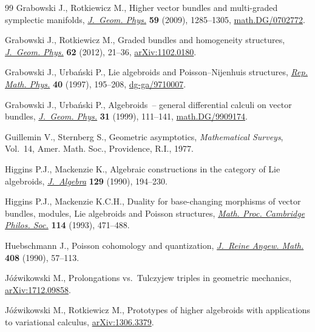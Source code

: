 \documentclass[10pt,a4paper]{amsart}
\numberwithin{equation}{section}
\theoremstyle{definition}
\begin{document}
\begin{thebibliography}{99}
Grabowski J., Rotkiewicz M., Higher vector bundles and multi-graded symplectic
 manifolds, \href{https://doi.org/10.1016/j.geomphys.2009.06.009}{\textit{J.~Geom. Phys.}} \textbf{59} (2009), 1285--1305,
 \href{https://arxiv.org/abs/math.DG/0702772}{math.DG/0702772}.

Grabowski J., Rotkiewicz M., Graded bundles and homogeneity structures,
 \href{https://doi.org/10.1016/j.geomphys.2011.09.004}{\textit{J.~Geom. Phys.}} \textbf{62} (2012), 21--36, \href{https://arxiv.org/abs/1102.0180}{arXiv:1102.0180}.

Grabowski J., Urba\'{n}ski P., Lie algebroids and {P}oisson--{N}ijenhuis
 structures, \href{https://doi.org/10.1016/S0034-4877(97)85916-2}{\textit{Rep. Math. Phys.}} \textbf{40} (1997), 195--208,
 \href{https://arxiv.org/abs/dg-ga/9710007}{dg-ga/9710007}.

Grabowski J., Urba\'{n}ski P., Algebroids~-- general differential calculi on
 vector bundles, \href{https://doi.org/10.1016/S0393-0440(99)00007-8}{\textit{J.~Geom. Phys.}} \textbf{31} (1999), 111--141,
 \href{https://arxiv.org/abs/math.DG/9909174}{math.DG/9909174}.

Guillemin V., Sternberg S., Geometric asymptotics, \textit{Mathematical
 Surveys}, Vol.~14, Amer. Math. Soc., Providence, R.I., 1977.

Higgins P.J., Mackenzie K., Algebraic constructions in the category of {L}ie
 algebroids, \href{https://doi.org/10.1016/0021-8693(90)90246-K}{\textit{J.~Algebra}} \textbf{129} (1990), 194--230.

Higgins P.J., Mackenzie K.C.H., Duality for base-changing morphisms of vector
 bundles, modules, {L}ie algebroids and {P}oisson structures, \href{https://doi.org/10.1017/S0305004100071760}{\textit{Math.
 Proc. Cambridge Philos. Soc.}} \textbf{114} (1993), 471--488.

Huebschmann J., Poisson cohomology and quantization, \href{https://doi.org/10.1515/crll.1990.408.57}{\textit{J.~Reine Angew.
 Math.}} \textbf{408} (1990), 57--113.

J\'{o}\'{z}wikowski M., Prolongations vs.~{T}ulczyjew triples in geometric
 mechanics, \href{https://arxiv.org/abs/1712.09858}{arXiv:1712.09858}.

J\'{o}\'{z}wikowski M., Rotkiewicz M., Prototypes of higher algebroids with
 applications to variational calculus, \href{https://arxiv.org/abs/1306.3379}{arXiv:1306.3379}.


\end{thebibliography}
\end{document}

